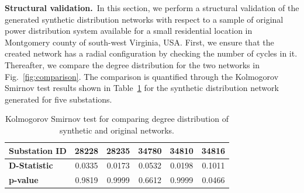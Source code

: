 \documentclass[sigconf]{acmart}
\begin{document}
\noindent\textbf{Structural validation.}~In this section, we perform a structural validation of the generated synthetic distribution networks with respect to a sample of original power distribution system available for a small residential location in Montgomery county of south-west Virginia, USA. First, we ensure that the created network has a radial configuration by checking the number of cycles in it. Thereafter, we compare the degree distribution for the two networks in Fig.~\ref{fig:comparison}. The comparison is quantified through the Kolmogorov Smirnov test results shown in Table~\ref{tab:deg} for the synthetic distribution network generated for five substations.
\begin{table}[htb]
	\centering
	\caption{Kolmogorov Smirnov test for comparing degree distribution of synthetic and original networks.}
	\label{tab:deg}
	\begin{footnotesize}
		\begin{tabular}{lccccc}
			\hline
			\textbf{Substation ID} & 28228 & 28235 & 34780 & 34810 & 34816 \\ \hline
			\textbf{D-Statistic} & 0.0335 & 0.0173 & 0.0532 & 0.0198 & 0.1011 \\ \hline
			\textbf{p-value} & 0.9819 & 0.9999 & 0.6612 & 0.9999 & 0.0466 \\ \hline
		\end{tabular}
	\end{footnotesize}
\end{table}
\end{document}
